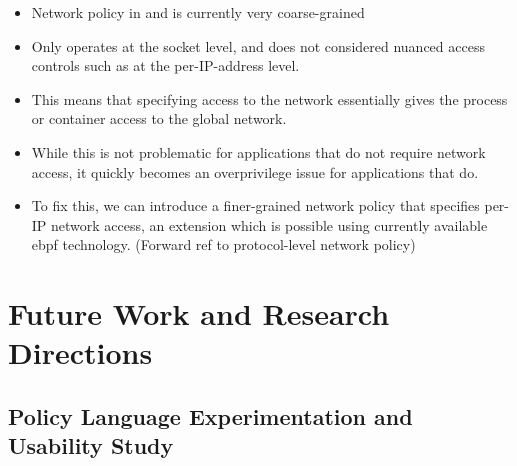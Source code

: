 \begin{inprogress}
  \begin{itemize}
    \item Network policy in \bpfbox{} and \bpfcontain{} is currently very coarse-grained
    \item Only operates at the socket level, and does not considered nuanced access
    controls such as at the per-IP-address level.
    \item This means that specifying access to the network essentially gives the process or container
    access to the global network.
    \item While this is not problematic for applications that do not require network access,
    it quickly becomes an overprivilege issue for applications that do.
    \item To fix this, we can introduce a finer-grained network policy that specifies per-IP network access, an extension which
    is possible using currently available \gls{ebpf} technology. (Forward ref to protocol-level network policy)
  \end{itemize}
\end{inprogress}


\section{Future Work and Research Directions}%
\label{s:disc-future-work}


\subsection{Policy Language Experimentation and Usability Study}

